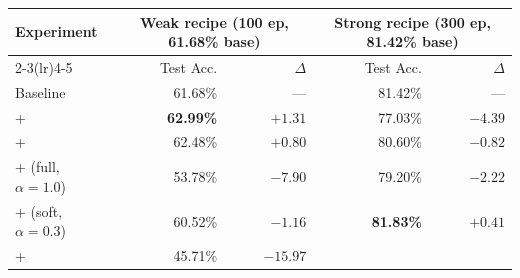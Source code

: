 \begin{table}[ht]
    \centering
    \small
    \begin{tabular}{lrrrr}
        \toprule
        \multirow{2}{*}{Experiment}                            &
        \multicolumn{2}{c}{Weak recipe (100 ep, 61.68\% base)} &
        \multicolumn{2}{c}{Strong recipe (300 ep, 81.42\% base)}
        \\
        \cmidrule(lr){2-3}\cmidrule(lr){4-5}                   &
        Test Acc.                                              &
        $\Delta$                                               &
        Test Acc.                                              &
        $\Delta$
        \\
        \midrule
        Baseline                                               &
        61.68\%                                                &
        ---                                                    &
        81.42\%                                                &
        ---
        \\
        \midrule
        + \methodA{}                                           &
        \textbf{62.99\%}                                       &
        $+1.31$\pp{}                                           &
        77.03\%                                                &
        $-4.39$\pp{}
        \\
        + \methodD{}                                           &
        62.48\%                                                &
        $+0.80$\pp{}                                           &
        80.60\%                                                &
        $-0.82$\pp{}
        \\
        + \methodB{} (full, $\alpha{=}1.0$)                    &
        53.78\%                                                &
        $-7.90$\pp{}                                           &
        79.20\%                                                &
        $-2.22$\pp{}
        \\
        + \methodB{} (soft, $\alpha{=}0.3$)                    &
        60.52\%                                                &
        $-1.16$\pp{}                                           &
        \textbf{81.83\%}                                       &
        $+0.41$\pp{}
        \\
        + \methodC{}                                           &
        45.71\%                                                &
        $-15.97$\pp{}                                          &

\end{tabular}
\end{table}
